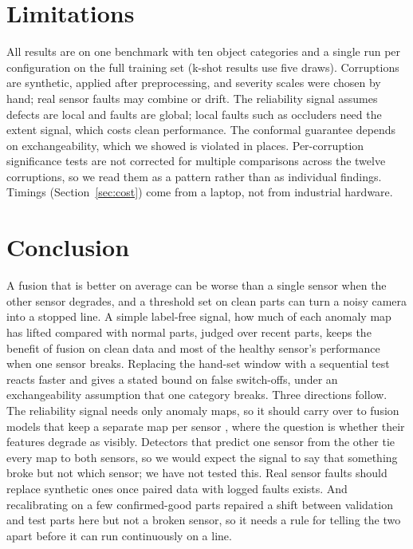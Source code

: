 \documentclass[10pt,twocolumn,letterpaper]{article}
\begin{document}
\section{Limitations}

All results are on one benchmark with ten object categories and a single run per configuration on the full training set (k-shot results use five draws). Corruptions are synthetic, applied after preprocessing, and severity scales were chosen by hand; real sensor faults may combine or drift. The reliability signal assumes defects are local and faults are global; local faults such as occluders need the extent signal, which costs clean performance. The conformal guarantee depends on exchangeability, which we showed is violated in places. Per-corruption significance tests are not corrected for multiple comparisons across the twelve corruptions, so we read them as a pattern rather than as individual findings. Timings (Section~\ref{sec:cost}) come from a laptop, not from industrial hardware.

\section{Conclusion}

A fusion that is better on average can be worse than a single sensor when the other sensor degrades, and a threshold set on clean parts can turn a noisy camera into a stopped line. A simple label-free signal, how much of each anomaly map has lifted compared with normal parts, judged over recent parts, keeps the benefit of fusion on clean data and most of the healthy sensor's performance when one sensor breaks. Replacing the hand-set window with a sequential test reacts faster and gives a stated bound on false switch-offs, under an exchangeability assumption that one category breaks. Three directions follow. The reliability signal needs only anomaly maps, so it should carry over to fusion models that keep a separate map per sensor \citep{wang2023m3dm}, where the question is whether their features degrade as visibly. Detectors that predict one sensor from the other \citep{costanzino2024cfm} tie every map to both sensors, so we would expect the signal to say that something broke but not which sensor; we have not tested this. Real sensor faults should replace synthetic ones once paired data with logged faults exists. And recalibrating on a few confirmed-good parts repaired a shift between validation and test parts here but not a broken sensor, so it needs a rule for telling the two apart before it can run continuously on a line.
\end{document}
